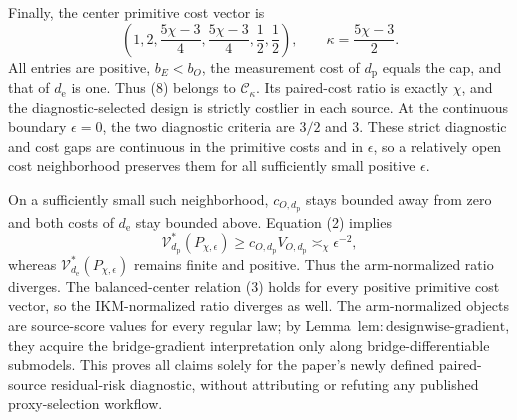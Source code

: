 Finally, the center primitive cost vector is
\[
 \left(1,2,\frac{5\chi-3}{4},\frac{5\chi-3}{4},\frac12,\frac12\right),
 \qquad
 \kappa=\frac{5\chi-3}{2}.                               \tag{8}
\]
All entries are positive, \(b_E<b_O\), the measurement cost of \(d_{\mathrm p}\) equals the cap, and that of \(d_{\mathrm e}\) is one.  Thus (8) belongs to \(\mathcal C_\kappa\).  Its paired-cost ratio is exactly \(\chi\), and the diagnostic-selected design is strictly costlier in each source.  At the continuous boundary \(\epsilon=0\), the two diagnostic criteria are \(3/2\) and \(3\).  These strict diagnostic and cost gaps are continuous in the primitive costs and in \(\epsilon\), so a relatively open cost neighborhood preserves them for all sufficiently small positive \(\epsilon\).

On a sufficiently small such neighborhood, \(c_{O,d_{\mathrm p}}\) stays bounded away from zero and both costs of \(d_{\mathrm e}\) stay bounded above.  Equation (2) implies
\[
 \mathcal V_{d_{\mathrm p}}^*(P_{\chi,\epsilon})
 \ge c_{O,d_{\mathrm p}}V_{O,d_{\mathrm p}}
 \asymp_\chi\epsilon^{-2},
\]
whereas \(\mathcal V_{d_{\mathrm e}}^*(P_{\chi,\epsilon})\) remains finite and positive.  Thus the arm-normalized ratio diverges.  The balanced-center relation (3) holds for every positive primitive cost vector, so the IKM-normalized ratio diverges as well.  The arm-normalized objects are source-score values for every regular law; by Lemma~\(\mathrm{lem{:}designwise\text{-}gradient}\), they acquire the bridge-gradient interpretation only along bridge-differentiable submodels.  This proves all claims solely for the paper's newly defined paired-source residual-risk diagnostic, without attributing or refuting any published proxy-selection workflow.